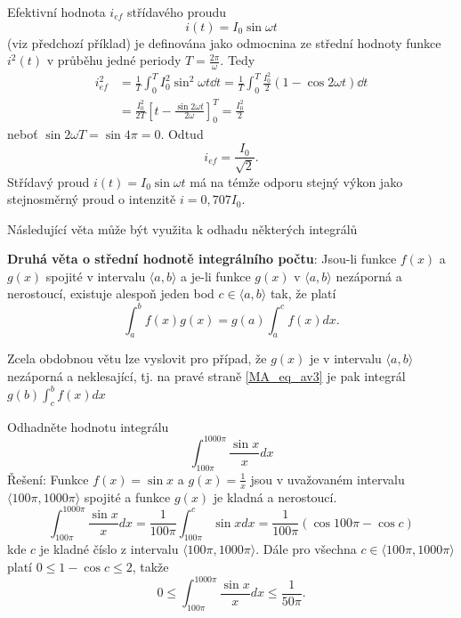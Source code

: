       

  \begin{example} Efektivní hodnota $i_{ef}$ střídavého proudu $$i(t) = I_0\sin\omega t$$ (viz
    předchozí příklad) je definována jako odmocnina ze střední hodnoty funkce $i^2(t)$ v průběhu
    jedné periody $T = \frac{2\pi}{\omega}$. Tedy
    \begin{align*}
      i_{ef}^2 &= \frac{1}{T}\int_0^T I_0^2\sin^2\omega t\dd{t} = 
                  \frac{1}{T}\int_0^T \frac{I_0^2}{2}(1- \cos2\omega t)\dd{t}           \\
               &= \frac{I_0^2}{2T}
                  \left[
                    t-\frac{\sin2\omega t}{2\omega}
                  \right]_0^T = \frac{I_0^2}{2}
    \end{align*}
    neboť $\sin2\omega T=\sin4\pi = 0.$ Odtud $$i_{ef} = \frac{I_0}{\sqrt{2}}.$$ Střídavý proud
    $i(t) = I_0\sin\omega t$ má na témže odporu stejný výkon jako stejnosměrný proud o intenzitě
    $i = 0,707I_0$.
  \end{example}
  Následující věta může být využita k odhadu některých integrálů
  \begin{lemma}
    \textbf{Druhá věta o střední hodnotě integrálního počtu}: Jsou-li funkce $f(x)$ a $g(x)$
    spojité v intervalu $\langle a, b \rangle$ a je-li funkce $g(x)$ v $\langle a, b \rangle$
    nezáporná a nerostoucí, existuje alespoň jeden bod $c\in\langle a, b \rangle$ tak, že platí
    \begin{equation}\label{MA_eq_av3}
        \int_a^b f(x)g(x) = g(a)\int_a^c f(x)dx.
    \end{equation}
  \end{lemma}
  Zcela obdobnou větu lze vyslovit pro případ, že $g(x)$ je v intervalu $\langle a, b \rangle$
  nezáporná a neklesající, tj. na pravé straně \ref{MA_eq_av3} je pak integrál $g(b)\int_c^b
  f(x)dx$

  \begin{example} Odhadněte hodnotu integrálu
    \begin{equation}\label{MA_eq_sinx_x}
        \int_{100\pi}^{1000\pi}\frac{\sin x}{x}dx
    \end{equation}
    Řešení: Funkce $f(x) = \sin x$ a $g(x) = \frac{1}{x}$ jsou v uvažovaném intervalu $\langle
    100\pi, 1000\pi \rangle$ spojité a funkce $g(x)$ je kladná a nerostoucí.
    \begin{equation*}
      \int_{100\pi}^{1000\pi}\frac{\sin x}{x}dx = 
      \frac{1}{100\pi}\int_{100\pi}^c\sin xdx =\frac{1}{100\pi}\left(\cos100\pi - \cos c\right)
    \end{equation*}
    kde $c$ je kladné číslo z intervalu $\langle 100\pi, 1000\pi \rangle$. Dále pro všechna
    $c\in\langle 100\pi, 1000\pi \rangle$ platí $0\leq1-\cos c\leq2$, takže
    \begin{equation*}
        0\leq\int_{100\pi}^{1000\pi}\frac{\sin x}{x}dx\leq \frac{1}{50\pi}.
    \end{equation*}
  \end{example}   

\printbibliography[heading=subbibliography]
